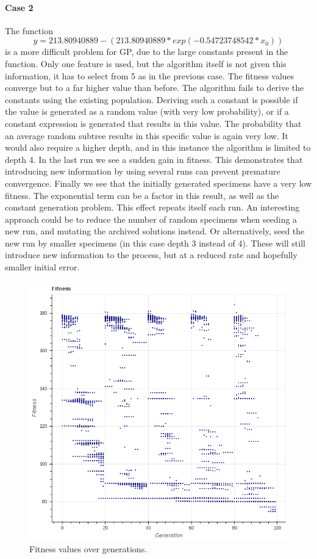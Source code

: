 \documentclass[10pt]{extarticle}
\begin{document}
\paragraph{Case 2}
The function 
\[
y=213.80940889 - (213.80940889*exp(-0.54723748542*x_0))
\] is a more difficult problem for GP, due to the large constants present in the function. Only one feature is used, but the algorithm itself is not given this information, it has to select from 5 as in the previous case.
The fitness values converge but to a far higher value than before. The algorithm fails to derive the constants using the existing population. Deriving such a constant is possible if the value is generated as a random value (with very low probability), or if a constant expression is generated that results in this value. The probability that an average random subtree results in this specific value is again very low. It would also require a higher depth, and in this instance the algorithm is limited to depth 4.
In the last run we see a sudden gain in fitness. This demonstrates that introducing new information by using several runs can prevent premature convergence.
Finally we see that the initially generated specimens have a very low fitness. The exponential term can be a factor in this result, as well as the constant generation problem. This effect repeats itself each run. 
An interesting approach could be to reduce the number of random specimens when seeding a new run, and mutating the archived solutions instead. Or alternatively, seed the new run by smaller specimens (in this case depth 3 instead of 4). These will still introduce new information to the process, but   at a reduced rate and hopefully smaller initial error.
\begin{figure}[H]
	\caption{Fitness values over generations.}
	\label{fig:fit2}
	\includegraphics[scale=0.3]{figures/fitness2.png}
\end{figure}
\end{document}
